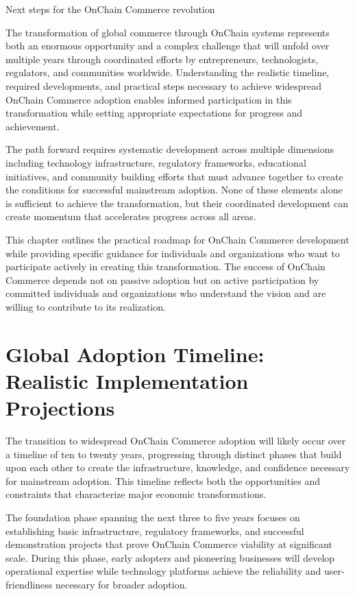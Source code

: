 \documentclass[
  Letterpaper,
]{scrbook}
\begin{document}
Next steps for the OnChain Commerce revolution

The transformation of global commerce through OnChain systems represents
both an enormous opportunity and a complex challenge that will unfold
over multiple years through coordinated efforts by entrepreneurs,
technologists, regulators, and communities worldwide. Understanding the
realistic timeline, required developments, and practical steps necessary
to achieve widespread OnChain Commerce adoption enables informed
participation in this transformation while setting appropriate
expectations for progress and achievement.

The path forward requires systematic development across multiple
dimensions including technology infrastructure, regulatory frameworks,
educational initiatives, and community building efforts that must
advance together to create the conditions for successful mainstream
adoption. None of these elements alone is sufficient to achieve the
transformation, but their coordinated development can create momentum
that accelerates progress across all areas.

This chapter outlines the practical roadmap for OnChain Commerce
development while providing specific guidance for individuals and
organizations who want to participate actively in creating this
transformation. The success of OnChain Commerce depends not on passive
adoption but on active participation by committed individuals and
organizations who understand the vision and are willing to contribute to
its realization.

\section{Global Adoption Timeline: Realistic Implementation
Projections}\label{global-adoption-timeline-realistic-implementation-projections}

The transition to widespread OnChain Commerce adoption will likely occur
over a timeline of ten to twenty years, progressing through distinct
phases that build upon each other to create the infrastructure,
knowledge, and confidence necessary for mainstream adoption. This
timeline reflects both the opportunities and constraints that
characterize major economic transformations.

The foundation phase spanning the next three to five years focuses on
establishing basic infrastructure, regulatory frameworks, and successful
demonstration projects that prove OnChain Commerce viability at
significant scale. During this phase, early adopters and pioneering
businesses will develop operational expertise while technology platforms
achieve the reliability and user-friendliness necessary for broader
adoption.
\end{document}
